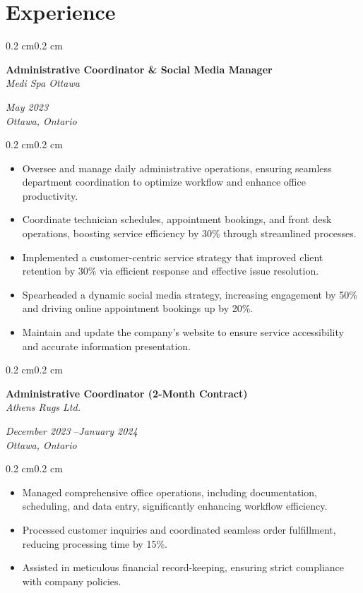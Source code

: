 \documentclass[10pt, letterpaper]{article}
\newenvironment{highlights}{%
    \begin{itemize}[
        topsep=0.10 cm,%
        parsep=0.10 cm,%
        partopsep=0pt,%
        itemsep=0pt,%
        leftmargin=0.4 cm + 10pt%
    ]
}{%
    \end{itemize}%
}
\newenvironment{onecolentry}{%
    \begin{adjustwidth}{0.2 cm}{0.2 cm}%
}{%
    \end{adjustwidth}%
}
\newenvironment{twocolentry}[1]{%
    \begin{onecolentry}%
    \def\twocolentryarg{#1}%
    \noindent
    \begin{minipage}[t]{0.68\textwidth} %
}{%
    \end{minipage}\hfill%
    \begin{minipage}[t]{0.30\textwidth} %
      \raggedleft\twocolentryarg
    \end{minipage}%
    \vspace{0.2cm}%
    \end{onecolentry}%
}
\begin{document}
\section{Experience}
\begin{twocolentry}{%
\textit{May 2023 }\textit{} \\[0.1cm]
\textit{Ottawa, Ontario}%
}
    \textbf{Administrative Coordinator \& Social Media Manager }\\
    \textit{Medi Spa Ottawa }
\end{twocolentry}
\vspace{0.10 cm}
\begin{onecolentry}
    \begin{highlights}
        \item Oversee and manage daily administrative operations, ensuring seamless department coordination to optimize workflow and enhance office productivity.
        \item Coordinate technician schedules, appointment bookings, and front desk operations, boosting service efficiency by 30\% through streamlined processes.
        \item Implemented a customer-centric service strategy that improved client retention by 30\% via efficient response and effective issue resolution.
        \item Spearheaded a dynamic social media strategy, increasing engagement by 50\% and driving online appointment bookings up by 20\%.
        \item Maintain and update the company’s website to ensure service accessibility and accurate information presentation.
    \end{highlights}
\end{onecolentry}
\vspace{0.2 cm}
\begin{twocolentry}{%
\textit{December 2023 }--\textit{January 2024} \\[0.1cm]
\textit{Ottawa, Ontario}%
}
    \textbf{Administrative Coordinator (2-Month Contract) }\\
    \textit{Athens Rugs Ltd. }
\end{twocolentry}
\vspace{0.10 cm}
\begin{onecolentry}
    \begin{highlights}
        \item Managed comprehensive office operations, including documentation, scheduling, and data entry, significantly enhancing workflow efficiency.
        \item Processed customer inquiries and coordinated seamless order fulfillment, reducing processing time by 15\%.
        \item Assisted in meticulous financial record-keeping, ensuring strict compliance with company policies.
    \end{highlights}
\end{onecolentry}
\end{document}
